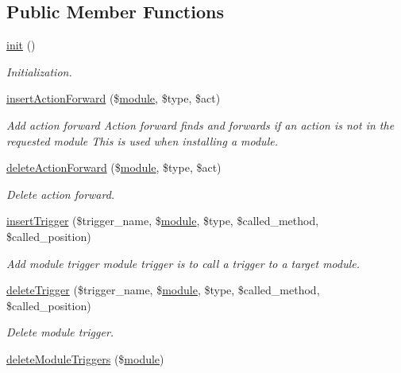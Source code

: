 \subsection*{Public Member Functions}
\begin{DoxyCompactItemize}
\item 
\hyperlink{classmoduleController_a589d3d74f4601ae495a33d001ad8ffa0}{init} ()
\begin{DoxyCompactList}\small\item\em Initialization. \end{DoxyCompactList}\item 
\hyperlink{classmoduleController_a9a5ff2def7412c659594c62a4615a0cd}{insert\+Action\+Forward} (\$\hyperlink{classmodule}{module}, \$type, \$act)
\begin{DoxyCompactList}\small\item\em Add action forward Action forward finds and forwards if an action is not in the requested module This is used when installing a module. \end{DoxyCompactList}\item 
\hyperlink{classmoduleController_ad256622e3b12acb2d96997315dc6fc45}{delete\+Action\+Forward} (\$\hyperlink{classmodule}{module}, \$type, \$act)
\begin{DoxyCompactList}\small\item\em Delete action forward. \end{DoxyCompactList}\item 
\hyperlink{classmoduleController_ad4fb0e3cfddb064ffcc9d71f983066a9}{insert\+Trigger} (\$trigger\+\_\+name, \$\hyperlink{classmodule}{module}, \$type, \$called\+\_\+method, \$called\+\_\+position)
\begin{DoxyCompactList}\small\item\em Add module trigger module trigger is to call a trigger to a target module. \end{DoxyCompactList}\item 
\hyperlink{classmoduleController_a60dbf5d358cddb566b3d3e297a003d23}{delete\+Trigger} (\$trigger\+\_\+name, \$\hyperlink{classmodule}{module}, \$type, \$called\+\_\+method, \$called\+\_\+position)
\begin{DoxyCompactList}\small\item\em Delete module trigger. \end{DoxyCompactList}\item 
\hyperlink{classmoduleController_a48fb7491a1b86e30895ff4be5df7587d}{delete\+Module\+Triggers} (\$\hyperlink{classmodule}{module})

\end{DoxyCompactItemize}
